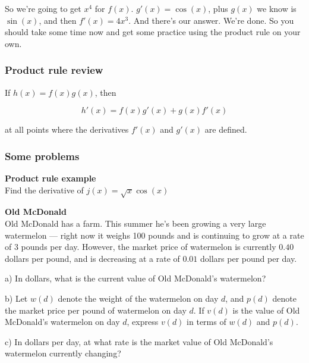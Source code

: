 \documentclass[pdftex, brazil, 12pt, twoside]{article}
\begin{document}
So we're going to get $x^4$ for $f(x)$.
$g'(x) = \cos{(x)}$, plus $g(x)$ we know
is $\sin{(x)}$, and then $f'(x) = 4x^3$.
And there's our answer.
We're done.
So you should take some time now and get some practice using
the product rule on your own.

\subsubsection{Product rule review}
\label{u2-product-rule-product-rule-review}

If $h(x) = f(x)g(x)$, then

\begin{equation*}
  h'(x) = f(x)g'(x) + g(x)f'(x)
\end{equation*}

at all points where the derivatives $f'(x)$ and $g'(x)$ are defined.

\subsubsection{Some problems}
\label{u2-product-rule-some-problems}

\begin{exercise}
  \textbf{Product rule example}\\%
  Find the derivative of $j(x) = \sqrt{x} \cos{(x)}$
\end{exercise}

\begin{exercise}
  \textbf{Old McDonald}\\%
  Old McDonald has a farm. This summer he's been growing a very large watermelon
  --- right now it weighs 100 pounds and is continuing to grow at a rate of 3 pounds
  per day. However, the market price of watermelon is currently $0.40$ dollars per
  pound, and is decreasing at a rate of $0.01$ dollars per pound per day.

  a) In dollars, what is the current value of Old McDonald's watermelon?

  b) Let $w(d)$ denote the weight of the watermelon on day $d$, and $p(d)$ denote
  the market price per pound of watermelon on day $d$. If $v(d)$ is the value of
  Old McDonald's watermelon on day $d$, express $v(d)$ in terms of $w(d)$ and $p(d)$.

  c) In dollars per day, at what rate is the market value of Old McDonald's watermelon
  currently changing?
\end{exercise}
\end{document}
